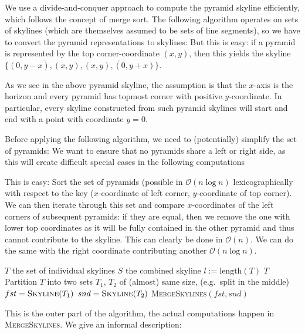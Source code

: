\documentclass[english, fontsize=12pt, paper=a4, twoside=false, draft=true, pagesize=auto, version=last, DIV=16]{scrartcl}
\theoremstyle{break}
\newcommand*\bigO{\mathcal{O}}
\begin{document}
We use a divide-and-conquer approach to compute the pyramid skyline efficiently, which
follows the concept of merge sort. The following algorithm operates on sets of skylines
(which are themselves assumed to be sets of line segments),
so we have to convert the pyramid representations to skylines: But this is easy: if a
pyramid is represented by the top corner-coordinate $(x,y)$, then this yields the skyline
$\{ \overline{(0,y-x), (x,y)}, \overline{(x,y), (0,y+x)} \}$.

As we see in the above pyramid skyline, the assumption is that the $x$-axis is the horizon
and every pyramid has topmost corner with positive $y$-coordinate. In particular, every
skyline constructed from such pyramid skylines will start and end with a point with
coordinate $y = 0$.

Before applying the following algorithm, we need to (potentially) simplify the set of
pyramids: We want to ensure that no pyramids share a left or right side, as this will
create difficult special cases in the following computations

This is easy: Sort the set of pyramids (possible in $\bigO(n\log n)$ lexicographically
with respect to the key ($x$-coordinate of left corner, $y$-coordinate of top corner).
We can then iterate through this set and compare $x$-coordinates of the left corners of
subsequent pyramids: if they are equal, then we remove the one with lower top coordinates
as it will be fully contained in the other pyramid and thus cannot contribute to the
skyline. This can clearly be done in $\bigO(n)$. We can do the same with the right
coordinate contributing another $\bigO(n\log n)$.

\begin{algorithm}
  \caption{$\text{\textsc{Skyline}}(T)$}
  \begin{algorithmic}[1]
    \Require $T$ the set of individual skylines
    \Ensure $S$ the combined skyline
    \State $l := \mathrm{length}(T)$
      \State \Return $T$
    \EndIf
    \State Partition $T$ into two sets $T_1$, $T_2$ of (almost) same size, (e.g.\ split in
      the middle)
    \State $fst = \text{\textsc{Skyline}}(T_1)$
    \State $snd = \text{\textsc{Skyline}}(T_2)$
    \State\Return \textsc{MergeSkylines}$(fst, snd)$
  \end{algorithmic}
\end{algorithm}

This is the outer part of the algorithm, the actual computations happen in
\textsc{MergeSkylines}. We give an informal description:
\end{document}
